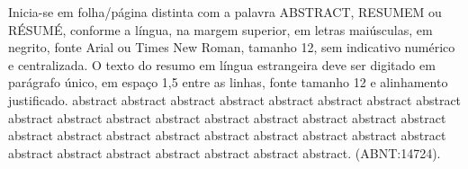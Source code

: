Inicia-se em folha/página distinta com a palavra ABSTRACT, RESUMEM ou RÉSUMÉ, conforme a língua, na margem superior, em letras maiúsculas, em negrito, fonte Arial ou Times New Roman, tamanho 12, sem indicativo numérico e centralizada. O texto do resumo em língua estrangeira deve ser digitado em parágrafo único, em espaço 1,5 entre as linhas, fonte tamanho 12 e alinhamento justificado. abstract abstract abstract abstract abstract abstract abstract abstract abstract abstract abstract abstract abstract abstract abstract abstract abstract abstract abstract abstract abstract abstract abstract abstract abstract abstract abstract abstract abstract abstract abstract abstract abstract. (ABNT:14724).


